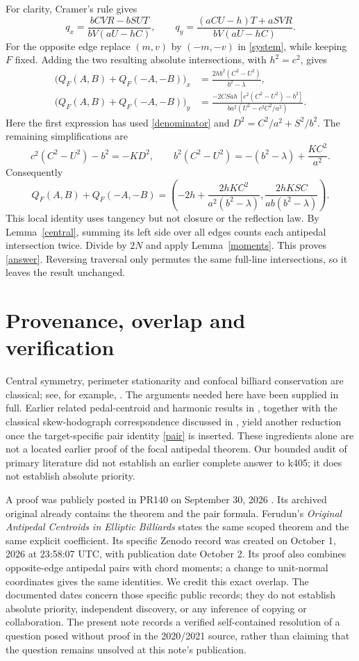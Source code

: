 \documentclass[11pt]{article}
\begin{document}
For clarity, Cramer's rule gives
\[
 q_x=\frac{bCVR-bSUT}{bV(aU-hC)},\qquad
 q_y=\frac{(aCU-h)T+aSVR}{bV(aU-hC)}.
\]
For the opposite edge replace $(m,v)$ by $(-m,-v)$ in
\eqref{system}, while keeping $F$ fixed. Adding the two resulting
absolute intersections, with $h^2=c^2$, gives
\begin{align}\label{pair_intermediate}
 \bigl(Q_F(A,B)+Q_F(-A,-B)\bigr)_x
   &=\frac{2hb^2(C^2-U^2)}{b^2-\lambda},\\
 \bigl(Q_F(A,B)+Q_F(-A,-B)\bigr)_y
   &=\frac{-2CSah\,[c^2(C^2-U^2)-b^2]}
           {ba^2(U^2-c^2C^2/a^2)}.\nonumber
\end{align}
Here the first expression has used \eqref{denominator} and
$D^2=C^2/a^2+S^2/b^2$. The remaining simplifications are
\[
 c^2(C^2-U^2)-b^2=-KD^2,\qquad
 b^2(C^2-U^2)=-(b^2-\lambda)+\frac{K C^2}{a^2}.
\]
Consequently
\begin{equation}\label{pair}
 Q_F(A,B)+Q_F(-A,-B)
 =\left(-2h+\frac{2hK C^2}{a^2(b^2-\lambda)},
              \frac{2hK SC}{ab(b^2-\lambda)}\right).
\end{equation}
This local identity uses tangency but not closure or the reflection
law. By Lemma~\ref{central}, summing its left side over all edges counts
each antipedal intersection twice. Divide by $2N$ and apply
Lemma~\ref{moments}. This proves \eqref{answer}. Reversing traversal
only permutes the same full-line intersections, so it leaves the result
unchanged.

\section{Provenance, overlap and verification}
Central symmetry, perimeter stationarity and confocal billiard
conservation are classical; see, for example, \cite{BT,Stachel}.
The arguments needed here have been supplied in full. Earlier related
pedal-centroid and harmonic results in \cite{BT}, together with the
classical skew-hodograph correspondence discussed in \cite{GT}, yield
another reduction once the target-specific pair identity \eqref{pair}
is inserted. These ingredients alone are not a located earlier proof
of the focal antipedal theorem. Our bounded audit of primary literature
did not establish an earlier complete answer to k405; it does not
establish absolute priority.

A proof was publicly posted in PR140 on September 30, 2026
\cite{PR140}. Its archived original already contains the theorem and
the pair formula. Ferudun's \emph{Original Antipedal Centroids in
Elliptic Billiards} \cite{Ferudun} states the same scoped theorem and
the same explicit coefficient. Its specific Zenodo record was created
on October 1, 2026 at 23:58:07 UTC, with publication date October 2.
Its proof also combines opposite-edge antipedal pairs with chord
moments; a change to unit-normal coordinates gives the same identities.
We credit this exact overlap. The documented dates concern those
specific public records; they do not establish absolute priority,
independent discovery, or any inference of copying or collaboration.
The present note records a verified self-contained resolution of a
question posed without proof in the 2020/2021 source, rather than
claiming that the question remains unsolved at this note's publication.
\end{document}

